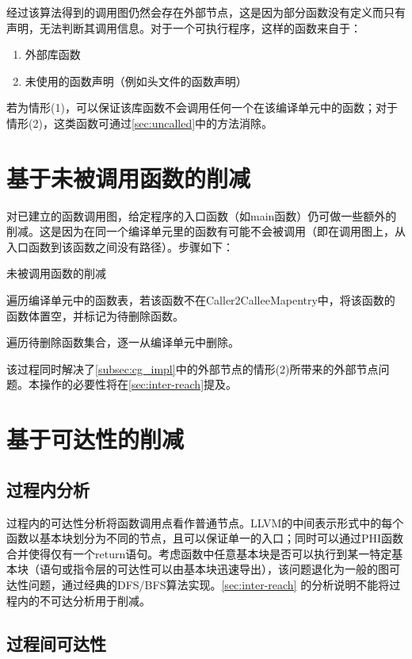 经过该算法得到的调用图仍然会存在外部节点，这是因为部分函数没有定义而只有声明，无法判断其调用信息。对于一个可执行程序，这样的函数来自于：
\begin{enumerate}[label={(\arabic*)}]
\item 外部库函数
\item 未使用的函数声明（例如头文件的函数声明）
\end{enumerate}
若为情形(1)，可以保证该库函数不会调用任何一个在该编译单元中的函数；对于情形(2)，这类函数可通过\autoref{sec:uncalled}中的方法消除。

\section{基于未被调用函数的削减}
\label{sec:uncalled}

对已建立的函数调用图，给定程序的入口函数（如main函数）仍可做一些额外的削减。这是因为在同一个编译单元里的函数有可能不会被调用（即在调用图上，从入口函数到该函数之间没有路径）。步骤如下：
\begin{algorithm}\label{alg:uncalled}
\caption{未被调用函数的削减}
\SetAlgoNoLine
遍历编译单元中的函数表，若该函数不在Caller2CalleeMapentry中，将该函数的函数体置空，并标记为待删除函数。

遍历待删除函数集合，逐一从编译单元中删除。
\end{algorithm}

该过程同时解决了\autoref{subsec:cg_impl}中的外部节点的情形(2)所带来的外部节点问题。本操作的必要性将在\autoref{sec:inter-reach}提及。

\section{基于可达性的削减}
\label{sec:reach}

\subsection{过程内分析}
\label{subsec:intra-reach}

过程内的可达性分析将函数调用点看作普通节点。LLVM的中间表示形式中的每个函数以基本块划分为不同的节点，且可以保证单一的入口；同时可以通过PHI函数合并使得仅有一个return语句。考虑函数中任意基本块是否可以执行到某一特定基本块（语句或指令层的可达性可以由基本块迅速导出），该问题退化为一般的图可达性问题，通过经典的DFS/BFS算法实现。\autoref{sec:inter-reach} 的分析说明不能将过程内的不可达分析用于削减。

\subsection{过程间可达性}
\label{sec:inter-reach}

